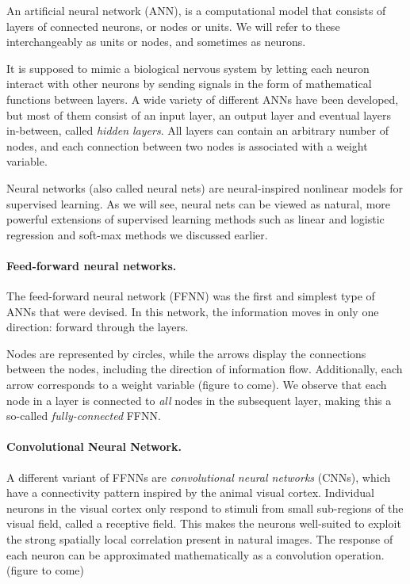 \documentclass[%
oneside,                 %
final,                   %
10pt]{article}
\begin{document}
An artificial neural network (ANN), is a computational model that
consists of layers of connected neurons, or nodes or units.  We will
refer to these interchangeably as units or nodes, and sometimes as
neurons.

It is supposed to mimic a biological nervous system by letting each
neuron interact with other neurons by sending signals in the form of
mathematical functions between layers.  A wide variety of different
ANNs have been developed, but most of them consist of an input layer,
an output layer and eventual layers in-between, called \emph{hidden
layers}. All layers can contain an arbitrary number of nodes, and each
connection between two nodes is associated with a weight variable.

Neural networks (also called neural nets) are neural-inspired
nonlinear models for supervised learning.  As we will see, neural nets
can be viewed as natural, more powerful extensions of supervised
learning methods such as linear and logistic regression and soft-max
methods we discussed earlier.


\paragraph{Feed-forward neural networks.}
The feed-forward neural network (FFNN) was the first and simplest type
of ANNs that were devised. In this network, the information moves in
only one direction: forward through the layers.

Nodes are represented by circles, while the arrows display the
connections between the nodes, including the direction of information
flow. Additionally, each arrow corresponds to a weight variable
(figure to come).  We observe that each node in a layer is connected
to \emph{all} nodes in the subsequent layer, making this a so-called
\emph{fully-connected} FFNN.



\paragraph{Convolutional Neural Network.}
A different variant of FFNNs are \emph{convolutional neural networks}
(CNNs), which have a connectivity pattern inspired by the animal
visual cortex. Individual neurons in the visual cortex only respond to
stimuli from small sub-regions of the visual field, called a receptive
field. This makes the neurons well-suited to exploit the strong
spatially local correlation present in natural images. The response of
each neuron can be approximated mathematically as a convolution
operation.  (figure to come)
\end{document}

